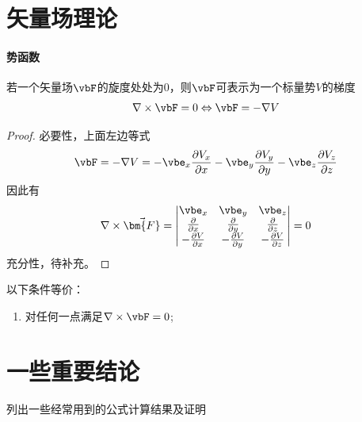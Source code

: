 \section{矢量场理论}
\paragraph{势函数}
若一个矢量场$\vbF$的旋度处处为0，则$\vbF$可表示为一个标量势$V$的梯度
\begin{equation}
    \nabla \times \vbF = 0 \Leftrightarrow \vbF = -\nabla V
    \label{eq:scalar-poten}
\end{equation}
\begin{proof}
    必要性，上面左边等式
    \begin{equation*}
        \vbF = - \nabla V = -\vbe_x \frac{\partial V_x}{\partial x}
                            -\vbe_y \frac{\partial V_y}{\partial y}
                            -\vbe_z \frac{\partial V_z}{\partial z}
    \end{equation*}
    因此有
    \begin{equation*}
        \nabla \times \vec{\bm{F}} = \left|\begin{matrix}
            \vbe_x  &   \vbe_y  &   \vbe_z  \\
            \frac{\partial}{\partial x} & \frac{\partial}{\partial y} & \frac{\partial}{\partial z} \\
            -\frac{\partial V}{\partial x} & -\frac{\partial V}{\partial y} & -\frac{\partial V}{\partial z}
        \end{matrix}\right|
        = 0
    \end{equation*}
    充分性，待补充。
\end{proof}

\begin{theorem}[无旋场]
    以下条件等价：
    \begin{enumerate}
        \item 对任何一点满足$\nabla \times \vbF = 0$;
    \end{enumerate}
\end{theorem}

\section{一些重要结论}
列出一些经常用到的公式计算结果及证明
